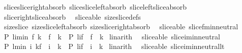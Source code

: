 \begin{isabellebody}
\ \ slice{\isacharunderscore}slice{\isacharunderscore}right{\isacharunderscore}absorb\ slice{\isacharunderscore}slice{\isacharunderscore}left{\isacharunderscore}absorb\ slice{\isacharunderscore}left{\isacharunderscore}slice{\isacharunderscore}absorb\ \isanewline
\ \ slice{\isacharunderscore}right{\isacharunderscore}slice{\isacharunderscore}absorb\isanewline
\isanewline
{}\isamarkupfalse%
\ {\isacharparenleft}\ sliceable{\isacharparenright}\ size{\isacharunderscore}slice{\isacharunderscore}defs\ {\isacharequal}\ \isanewline
\ \ size{\isacharunderscore}slice\ size{\isacharunderscore}slice{\isacharunderscore}left{\isacharunderscore}absorb\ size{\isacharunderscore}slice{\isacharunderscore}right{\isacharunderscore}absorb\isanewline
\isanewline
{}\isamarkupfalse%
\ {\isacharparenleft}\ sliceable{\isacharparenright}\ slice{\isacharunderscore}f{\isacharunderscore}min{\isacharunderscore}neutral{\isacharcolon}\ \isanewline
\ \ {\isachardoublequoteopen}{\isacharparenleft}P\ {\isacharparenleft}l{\isasymdagger}i{\isachardot}{\isachardot}{\isacharparenleft}min\ f\ k{\isacharparenright}{\isacharparenright}\ {\isasymand}\ f\ {\isasymle}\ k{\isacharparenright}\ {\isasymlongleftrightarrow}\ {\isacharparenleft}P\ {\isacharparenleft}l{\isasymdagger}i{\isachardot}{\isachardot}f{\isacharparenright}\ {\isasymand}\ f\ {\isasymle}\ k{\isacharparenright}{\isachardoublequoteclose}\isanewline
%
\isadelimproof
%
\endisadelimproof
%
\isatagproof
{}\isamarkupfalse%
\ linarith%
\endisatagproof
{\isafoldproof}%
%
\isadelimproof
\isanewline
%
\endisadelimproof
\isanewline
{}\isamarkupfalse%
\ {\isacharparenleft}\ sliceable{\isacharparenright}\ slice{\isacharunderscore}i{\isacharunderscore}min{\isacharunderscore}neutral{\isacharcolon}\ \isanewline
\ \ {\isachardoublequoteopen}{\isacharparenleft}P\ {\isacharparenleft}l{\isasymdagger}{\isacharparenleft}min\ i\ k{\isacharparenright}{\isachardot}{\isachardot}f{\isacharparenright}\ {\isasymand}\ i\ {\isasymle}\ k{\isacharparenright}\ {\isasymlongleftrightarrow}\ {\isacharparenleft}P\ {\isacharparenleft}l{\isasymdagger}i{\isachardot}{\isachardot}f{\isacharparenright}\ {\isasymand}\ i\ {\isasymle}\ k{\isacharparenright}{\isachardoublequoteclose}\isanewline
%
\isadelimproof
%
\endisadelimproof
%
\isatagproof
{}\isamarkupfalse%
\ linarith%
\endisatagproof
{\isafoldproof}%
%
\isadelimproof
\isanewline
%
\endisadelimproof
\isanewline
{}\isamarkupfalse%
\ {\isacharparenleft}\ sliceable{\isacharparenright}\ slice{\isacharunderscore}i{\isacharunderscore}min{\isacharunderscore}neutral{\isacharunderscore}lt{\isacharcolon}\ \isanewline

\end{isabellebody}
